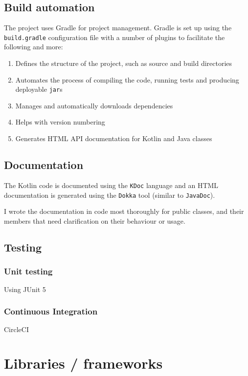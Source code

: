 \subsection{Build automation}

The project uses Gradle for project management.
Gradle is set up using the \texttt{build.gradle} configuration file with a number of plugins to facilitate the following and more:
\begin{enumerate}
    \item Defines the structure of the project, such as source and build directories
    \item Automates the process of compiling the code, running tests and producing deployable \texttt{jar}s
    \item Manages and automatically downloads dependencies
    \item Helps with version numbering
    \item Generates HTML API documentation for Kotlin and Java classes
\end{enumerate}

\subsection{Documentation}

The Kotlin code is documented using the \texttt{KDoc} language and an HTML documentation is generated using the \texttt{Dokka} tool (similar to \texttt{JavaDoc}).

I wrote the documentation in code most thoroughly for public classes, and their members that need clarification on their behaviour or usage.

\subsection{Testing}

\subsubsection{Unit testing}
Using JUnit 5

\subsubsection{Continuous Integration}
CircleCI



\section{Libraries / frameworks}





